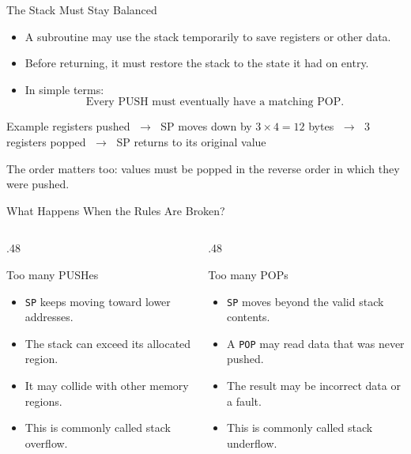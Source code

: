 \documentclass[9pt,aspectratio=169,xcolor=table]{beamer}
\begin{document}
\begin{frame}{The Stack Must Stay Balanced} \begin{itemize} \item A subroutine may use the stack temporarily to save registers or other data. \item Before returning, it must restore the stack to the state it had on entry. \item In simple terms: \[ \boxed{\text{Every PUSH must eventually have a matching POP.}} \] \end{itemize} \vspace{3mm} \begin{block}{Example}  registers pushed $\;\longrightarrow\;$ SP moves down by $3\times4=12$ bytes $\;\longrightarrow\;$ 3 registers popped $\;\longrightarrow\;$ SP returns to its original value \end{block} \vspace{3mm} {\small The order matters too: values must be popped in the \alert{reverse order} in which they were pushed. } \end{frame} %
\begin{frame}{What Happens When the Rules Are Broken?}  \vspace{3mm} \begin{columns}[T] \begin{column}{.48\textwidth} \begin{block}{Too many PUSHes} \begin{itemize}\itemsep2pt \item \texttt{SP} keeps moving toward lower addresses. \item The stack can exceed its allocated region. \item It may collide with other memory regions. \item This is commonly called \alert{stack overflow}. \end{itemize} \end{block} \end{column} \begin{column}{.48\textwidth} \begin{block}{Too many POPs} \begin{itemize}\itemsep2pt \item \texttt{SP} moves beyond the valid stack contents. \item A \texttt{POP} may read data that was never pushed. \item The result may be incorrect data or a fault. \item This is commonly called \alert{stack underflow}. \end{itemize} \end{block} \end{column} \end{columns} \end{frame}
\end{document}
